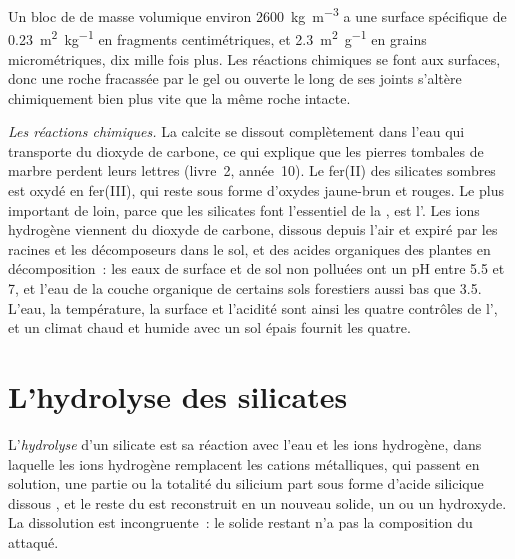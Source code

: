 Un bloc de  de masse volumique environ \qty{2600}{kg.m^{-3}} a une surface
spécifique de \qty{0.23}{m^2.kg^{-1}} en fragments centimétriques, et
\qty{2.3}{m^2.g^{-1}} en grains micrométriques, dix mille fois plus. Les réactions
chimiques se font aux surfaces, donc une roche fracassée par le gel ou ouverte le long de
ses joints s'altère chimiquement bien plus vite que la même roche intacte.

\emph{Les réactions chimiques.} La calcite se dissout complètement dans l'eau qui
transporte du dioxyde de carbone, ce qui explique que les pierres tombales de marbre perdent leurs lettres
(livre~2, année~10). Le fer(II) des silicates sombres est oxydé en fer(III),
qui reste sous forme d'oxydes jaune-brun et rouges. Le plus important de loin, parce que
les silicates font l'essentiel de la , est l'. Les ions hydrogène viennent du
dioxyde de carbone, dissous depuis l'air et expiré par les racines et les
décomposeurs dans le sol, et des acides organiques des plantes en décomposition~:
les eaux de surface et de sol non polluées ont un pH entre 5.5 et 7, et l'eau
de la couche organique de certains sols forestiers aussi bas que 3.5. L'eau, la température,
la surface et l'acidité sont ainsi les quatre contrôles de l',
et un climat chaud et humide avec un sol épais fournit les quatre.

\section{L'hydrolyse des silicates}\label{sec:b1:weathering-clays:hydrolysis}

\begin{definition}\label{def:b1:weathering-clays:hydrolysis}
L'\emph{hydrolyse} d'un silicate est sa
réaction avec l'eau et les ions hydrogène, dans laquelle les ions hydrogène remplacent les
cations métalliques, qui passent en solution, une partie ou la totalité du silicium part sous forme
d'acide silicique dissous , et le reste du  est reconstruit en
un nouveau solide, un  ou un hydroxyde. La dissolution est incongruente~:
le solide restant n'a pas la composition du  attaqué.
\end{definition}

